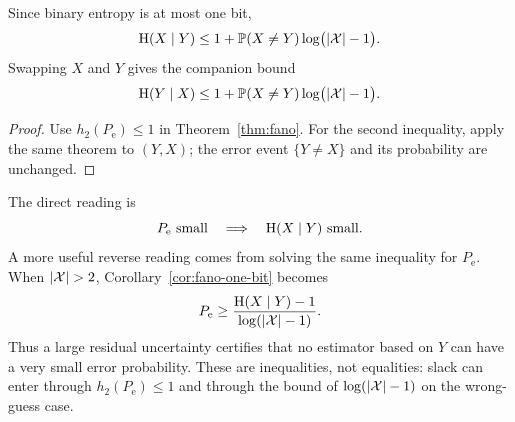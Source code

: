 \begin{corollary}\label{cor:fano-one-bit}
Since binary entropy is at most one bit,
\[
  \mathrm{H}(X\mid Y)
  \le 1+\mathbb{P}(X\ne Y)\log\bigl(|\mathcal{X}|-1\bigr).
\]
Swapping $X$ and $Y$ gives the companion bound
\[
  \mathrm{H}(Y\mid X)
  \le 1+\mathbb{P}(X\ne Y)\log\bigl(|\mathcal{X}|-1\bigr).
\]
\end{corollary}

\begin{proof}
Use $h_2(P_{\mathrm e})\le1$ in Theorem~\ref{thm:fano}. For the second
inequality, apply the same theorem to $(Y,X)$; the error event
$\{Y\ne X\}$ and its probability are unchanged.
\end{proof}

\color{inkiron}
The direct reading is
\[
  P_{\mathrm e}\text{ small}
  \quad\Longrightarrow\quad
  \mathrm{H}(X\mid Y)\text{ small}.
\]
A more useful reverse reading comes from solving the same inequality for
$P_{\mathrm e}$. When $|\X|>2$, Corollary~\ref{cor:fano-one-bit} becomes
\[
  P_{\mathrm e}
  \ge
  \frac{\mathrm{H}(X\mid Y)-1}{\log(|\mathcal{X}|-1)}.
\]
Thus a large residual uncertainty certifies that no estimator based on $Y$
can have a very small error probability. These are inequalities, not
equalities: slack can enter through $h_2(P_{\mathrm e})\le1$ and through the
bound of $\log(|\mathcal{X}|-1)$ on the wrong-guess case.
